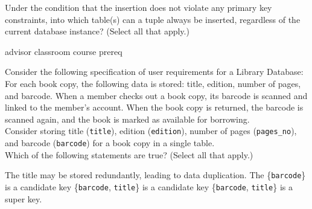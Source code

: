 \documentclass[12pt,answers]{exam}
\begin{document}
\begin{questions}
\begin{minipage}{\linewidth}
\question[4]
Under the condition that the insertion does not violate any primary key constraints, into which table(s) 
can a tuple always be inserted, regardless of the current database instance? (Select all that apply.)

\begin{checkboxes}
    \choice advisor
    \CorrectChoice classroom
    \CorrectChoice course
    \choice prereq
\end{checkboxes}
\end{minipage}

\begin{minipage}{\linewidth}
\question[4]
Consider the following specification of user requirements for a Library Database:
For each book copy, the following data is stored: title, edition, number of pages, and barcode. 
When a member checks out a book copy, its barcode is scanned and linked to the member’s account. 
When the book copy is returned, the barcode is scanned again, and the book is marked as available for borrowing.  
\\\newline
Consider storing title (\texttt{title}), edition (\texttt{edition}), number of pages (\texttt{pages\_no}), and barcode (\texttt{barcode}) for a book copy in a single table.  
\\\newline
Which of the following statements are true? (Select all that apply.)

\begin{checkboxes}
    \CorrectChoice The title may be stored redundantly, leading to data duplication. 
    \CorrectChoice The \{\texttt{barcode}\} is a candidate key
    \choice \{\texttt{barcode}, \texttt{title}\} is a candidate key
    \CorrectChoice \{\texttt{barcode}, \texttt{title}\} is a super key.
\end{checkboxes}
\end{minipage}

\end{questions}
\end{document}
